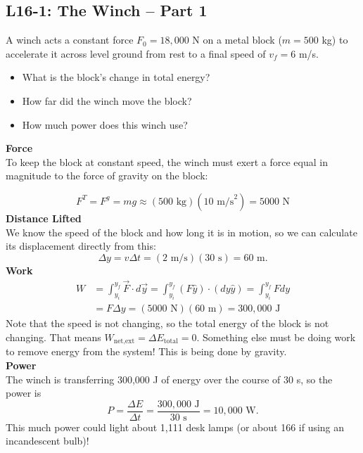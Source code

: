 \documentclass[]{article}
\newcommand{\Week}{16}
\begin{document}
\begin{PresentSpace}
\vspace{-10pt}
\section*{L\Week-1: The Winch -- Part 1}
\vspace{-10pt}
A winch acts a constant force $F_{0}=18,000$ N on a metal block ($m=500$ kg) to accelerate it across level ground from rest to a final speed of $v_{f}=6$ m/s.
\begin{itemize}
	\item What is the block's change in total energy?
	\item How far did the winch move the block?
	\item How much power does this winch use?
\end{itemize}
\end{PresentSpace}
\newpage
\begin{TeacherMargin}
\noindent\textbf{Force} \\
To keep the block at constant speed, the winch must exert a force equal in magnitude to the force of gravity on the block:
\begin{center}
\end{center}
\[
F^{T} = F^{g} = mg \approx (500\text{ kg})(10\text{ m/s}^{2}) = 5000\text{ N}
\]
\textbf{Distance Lifted} \\
We know the speed of the block and how long it is in motion, so we can calculate its displacement directly from this:
\[
\Delta y = v\Delta t = (2\text{ m/s})(30\text{ s}) = 60\text{ m}.
\]
\textbf{Work}
\begin{align*}
	W & = \int_{y_{i}}^{y_{f}}\vec{F}\cdot d\vec{y} = \int_{y_{i}}^{y_{f}}\left(F\hat{y}\right)\cdot\left(dy\hat{y}\right) = \int_{y_{i}}^{y_{f}}Fdy \\
	& = F\Delta y = (5000\text{ N})(60\text{ m}) = 300,000\text{ J}
\end{align*}
Note that the speed is not changing, so the total energy of the block is not changing. That means $W_{\text{net,ext}}=\Delta E_{\text{total}} = 0$. Something else must be doing work to remove energy from the system! This is being done by gravity. \\
\textbf{Power} \\
The winch is transferring 300,000 J of energy over the course of 30 s, so the power is
\[
P = \frac{\Delta E}{\Delta t} = \frac{300,000\text{ J}}{30\text{ s}} = 10,000\text{ W}.
\]
This much power could light about 1,111 desk lamps (or about 166 if using an incandescent bulb)!
\end{TeacherMargin}
\end{document}
